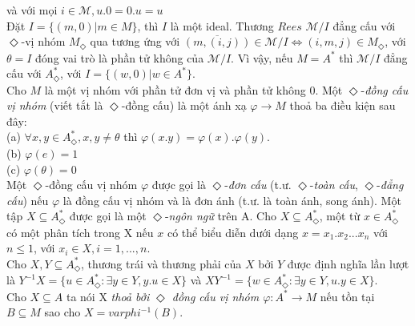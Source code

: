 \begin{flushleft} 
\hspace{20mm}và với mọi $i \in \mathcal{M}, u.0 = 0.u = u$ \\
\hspace{10mm}Đặt $I = \{ (m,0) | m \in M \}$, thì $I$ là một ideal. Thương $Rees$ $\mathcal{M}/I$ đẳng cấu với $\Diamond$-vị nhóm $M_\Diamond$ qua tương ứng với $\overline{(m,(i,j))} \in \mathcal{M}/I \Leftrightarrow (i,m,j) \in M_\Diamond$, với $\theta = I$ đóng vai trò là phần tử không của $\mathcal{M}/I$. Vì vậy, nếu $M = A^*$ thì $\mathcal{M}/I$ đẳng cấu với $A^*_\Diamond$, với $I = \{ (w,0) | w \in A^* \}$.\\
\hspace{10mm}Cho $M$ là một vị nhóm với phần tử đơn vị và phần tử không 0. Một $\Diamond$-\textit{đồng cấu vị nhóm} (viết tắt là $\Diamond$-đồng cấu) là một ánh xạ $\varphi \to M$ thoả ba điều kiện sau đây:\\
\hspace{20mm}(a) $\forall x,y \in A^*_\Diamond,x,y \ne \theta$ thì $\varphi(x.y) = \varphi(x).\varphi(y) $.\\
\hspace{20mm}(b) $\varphi(e) = 1$\\
\hspace{20mm}(c) $\varphi(\theta) = 0$\\
\hspace{10mm}Một $\Diamond$-đồng cấu vị nhóm $\varphi$ được gọi là $\Diamond$-\textit{đơn cấu} (t.ư. $\Diamond$-\textit{toàn cấu}, $\Diamond$-\textit{đẳng cấu}) nếu $\varphi$ là đồng cấu vị nhóm và là đơn ánh (t.ư. là toàn ánh, song ánh).
\hspace{10mm}Một tập $X \subseteq A^*_\Diamond$ được gọi là một $\Diamond$-\textit{ngôn ngữ} trên A. Cho $X \subseteq A^*_\Diamond$, một từ $x \in A^*_\Diamond$ có một phân tích trong X nếu $x$ có thể biểu diễn dưới dạng $x = x_1.x_2...x_n$ với $n \le 1$, với $x_i \in X, i = 1,...,n$.\\
\hspace{10mm}Cho $X,Y \subseteq A^*_\Diamond$, thương trái và thương phải của $X$ bởi $Y$ được định nghĩa lần lượt là $Y^{-1}X = \{ u \in A^*_\Diamond : \exists y \in Y , y.u \in X \}$ và $XY^{-1} = \{ w \in A^*_\Diamond : \exists y \in Y, u.y \in X \}$.\\
\hspace{10mm}Cho $X \subseteq A$ ta nói X \textit{thoả bởi $\Diamond$ đồng cấu vị nhóm $\varphi : A^* \to M$} nếu tồn tại $B \subseteq M$ sao cho $X = varphi^{-1}(B)$.\\

\end{flushleft}
